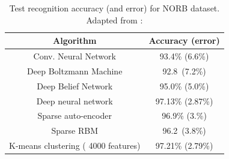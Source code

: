 \documentclass[journal]{IEEEtran}
\begin{document}
\begin{table}[!ht]
  \renewcommand{\arraystretch}{1.3}
  \caption{Test recognition accuracy (and error) for
  NORB dataset.\newline
  Adapted from : \cite{coates2011analysis} }
  \label{tab_coates_res}
  \centering
  \begin{tabular}{|c||c|}
  \hline
  Algorithm  &     Accuracy (error) \\
  \hline
  \hline
  Conv. Neural Network &    93.4\% (6.6\%)\\
  Deep Boltzmann Machine &      92.8\ (7.2\%)\\
  Deep Belief Network&    95.0\% (5.0\%)\\
  Deep neural network &    97.13\% (2.87\%)\\
  \hline
  Sparse auto-encoder &    96.9\% (3.\%)\\
  Sparse RBM &    96.2\ (3.8\%)\\
  K-means clustering ( 4000 features) &   97.21\% (2.79\%)\\
  \hline
  \end{tabular}
  \end{table}
\end{document}
